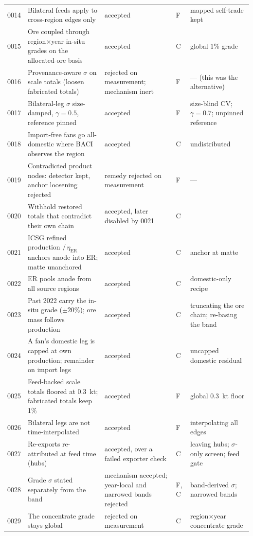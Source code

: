 \documentclass[11pt]{article}
\begin{document}
\begin{longtable}{@{}p{0.9cm}p{7.6cm}p{2.9cm}p{0.5cm}p{2.9cm}@{}}
0014 & Bilateral feeds apply to cross-region edges only & accepted & F & mapped self-trade kept \\
0015 & Ore coupled through region$\times$year in-situ grades on the allocated-ore basis & accepted & C & global 1\% grade \\
0016 & Provenance-aware $\sigma$ on scale totals (loosen fabricated totals) & rejected on measurement; mechanism inert & F & --- (this was the alternative) \\
0017 & Bilateral-leg $\sigma$ size-damped, $\gamma = 0.5$, reference pinned & accepted & F & size-blind CV; $\gamma = 0.7$; unpinned reference \\
0018 & Import-free fans go all-domestic where BACI observes the region & accepted & C & undistributed \\
0019 & Contradicted product nodes: detector kept, anchor loosening rejected & remedy rejected on measurement & F & --- \\
0020 & Withhold restored totals that contradict their own chain & accepted, later disabled by 0021 & C & \\
0021 & ICSG refined production $/\,\eta_{\mathrm{ER}}$ anchors anode into ER; matte unanchored & accepted & C & anchor at matte \\
0022 & ER pools anode from all source regions & accepted & C & domestic-only recipe \\
0023 & Past 2022 carry the in-situ grade ($\pm 20\%$); ore mass follows production & accepted & C & truncating the ore chain; re-basing the band \\
0024 & A fan's domestic leg is capped at own production; remainder on import legs & accepted & C & uncapped domestic residual \\
0025 & Feed-backed scale totals floored at 0.3~kt; fabricated totals keep 1\% & accepted & F & global 0.3~kt floor \\
0026 & Bilateral legs are not time-interpolated & accepted & F & interpolating all edges \\
0027 & Re-exports re-attributed at feed time (hubs) & accepted, over a failed exporter check & C & leaving hubs; $\sigma$-only screen; feed gate \\
0028 & Grade $\sigma$ stated separately from the band & mechanism accepted; year-local and narrowed bands rejected & F, C & band-derived $\sigma$; narrowed bands \\
0029 & The concentrate grade stays global & rejected on measurement & C & region$\times$year concentrate grade \\

\end{longtable}
\end{document}
